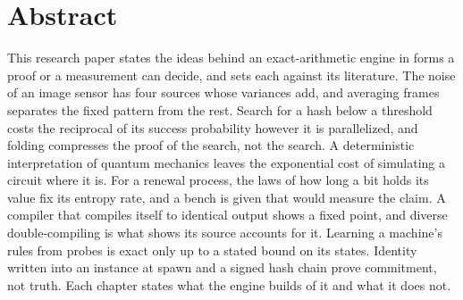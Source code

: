 \chapter*{Abstract}

This research paper states the ideas behind an exact-arithmetic engine in forms a proof or a
measurement can decide, and sets each against its literature. The noise of an image sensor has four
sources whose variances add, and averaging frames separates the fixed pattern from the rest. Search
for a hash below a threshold costs the reciprocal of its success probability however it is
parallelized, and folding compresses the proof of the search, not the search. A deterministic
interpretation of quantum mechanics leaves the exponential cost of simulating a circuit where it is.
For a renewal process, the laws of how long a bit holds its value fix its entropy rate, and a bench
is given that would measure the claim. A compiler that compiles itself to identical output shows a
fixed point, and diverse double-compiling is what shows its source accounts for it. Learning a
machine's rules from probes is exact only up to a stated bound on its states. Identity written into an
instance at spawn and a signed hash chain prove commitment, not truth. Each chapter states what the
engine builds of it and what it does not.
\cleardoublepage
